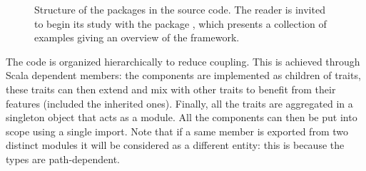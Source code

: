 \begin{figure}[H]
  \centering
  \caption[Source code packages structure]{Structure of the packages in the source code. The reader is invited to begin its study with the package , which presents a collection of examples giving an overview of the framework.}
  \label{fig:packages}
\end{figure}

The code is organized hierarchically to reduce coupling. This is achieved through Scala dependent members: the components are implemented as children of traits, these traits can then extend and mix with other traits to benefit from their features (included the inherited ones). Finally, all the traits are aggregated in a singleton object that acts as a module. All the components can then be put into scope using a single import. Note that if a same member is exported from two distinct modules it will be considered as a different entity: this is because the types are path-dependent.
